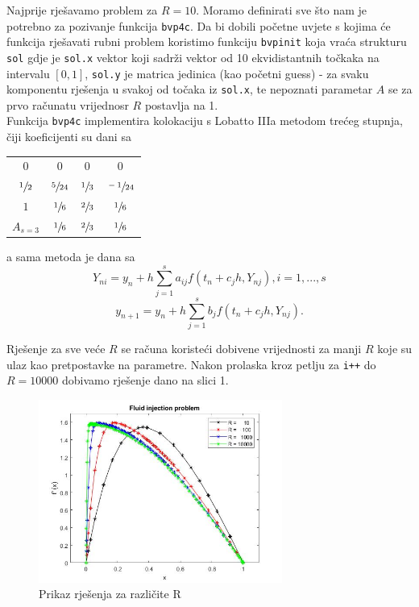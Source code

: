 \documentclass[a4paper]{article}
\newcommand{\code}[1]{\texttt{#1}}
\begin{document}
Najprije rješavamo problem za $R=10$. Moramo definirati sve što  nam je potrebno za pozivanje funkcija \code{bvp4c}.  Da bi dobili početne uvjete s kojima će funkcija rješavati rubni problem koristimo funkciju \code{bvpinit} koja vraća strukturu \code{sol} gdje je \code{sol.x} vektor koji sadrži vektor od 10 ekvidistantnih točkaka na intervalu $[0,1]$, \code{sol.y} je matrica jedinica (kao početni guess) - za svaku komponentu rješenja u svakoj od točaka iz \code{sol.x}, te nepoznati parametar $A$ se za prvo računatu vrijednosr $R$ postavlja na 1. \\
Funkcija \code{bvp4c} implementira kolokaciju s Lobatto IIIa metodom trećeg stupnja, čiji koeficijenti su dani sa

\begin{center}
\begin{tabular}{ c | c c c}
 $0$ & $0$ & $0$ & $0$\\ 
 $\sfrac{1}{2}$ & $\sfrac{5}{24}$ & $\sfrac{1}{3}$ & $\sfrac{-1}{24}$\\
 $1$ & $\sfrac{1}{6}$ & $\sfrac{2}{3}$ & $\sfrac{1}{6}$\\ 
 \hline  
 $A_{s=3}$ & $\sfrac{1}{6}$ & $\sfrac{2}{3}$ & $\sfrac{1}{6}$   
\end{tabular}
\end{center}

a sama metoda je dana sa
\[ Y_{ni} = y_n + h \sum_{j=1}^{s} a_{ij} f ( t_n + c_jh, Y_{nj} ) ,   i=1,...,s\]
\[ y_{n+1} = y_n + h \sum_{j=1}^{s} b_j f ( t_n + c_jh,Y_{nj} ) .\]

Rješenje za sve veće $R$ se računa koristeći dobivene vrijednosti za manji $R$ koje su ulaz kao pretpostavke na parametre. Nakon prolaska kroz petlju za \code{i++} do $R=10000$ dobivamo rješenje dano na slici 1.

\begin{figure}[!htbp]
\begin{center}
\includegraphics[width=8cm]{fig1.jpg}
\end{center}
\caption{Prikaz rješenja za različite R}
\end{figure}
\end{document}
